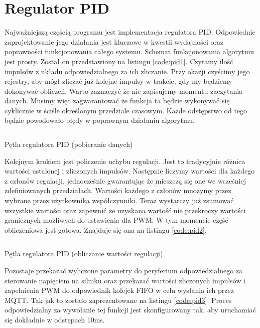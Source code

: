     \section{Regulator PID}     %
     Najważniejszą częścią programu jest implementacja regulatora PID. Odpowiednie zaprojektowanie jego działania jest kluczowe w kwestii wydajności oraz poprawności funkcjonowania całego systemu. Schemat funkcjonowania algorytmu jest prosty. Został on przedstawiony na listingu \ref{code:pid1}. Czytamy ilość impulsów z układu odpowiedzialnego za ich zliczanie. Przy okazji czyścimy jego rejestry, aby mógł zliczać już kolejne impulsy w trakcie, gdy my będziemy dokonywać obliczeń. Warto zaznaczyć że nie zapisujemy momentu zaczytania danych. Musimy więc zagwarantować że funkcja ta będzie wykonywać się cyklicznie w ściśle określonym przedziale czasowym. Każde odstępstwo od tego będzie powodowało błędy w poprawnym działaniu algorytmu. 
     
    \begin{kod}
      \inputminted[firstline=1,lastline=8]{cpp}{esp/listings/pid.cpp}
      \caption{Pętla regulatora PID (pobieranie danych)}
      \label{code:pid1}
      \vspace{2em}
    \end{kod}

     Kolejnym krokiem jest policzenie uchybu regulacji. Jest to tradycyjnie różnica wartości ustalonej i zliczonych impulsów. Następnie liczymy wartości dla każdego z członów regulacji, jednocześnie gwarantując że mieszczą się one we wcześniej zdefiniowanych przedziałach. Wartości każdego z członów mnożymy przez wybrane przez użytkownika współczynniki. Teraz wystarczy już zsumować wszystkie wartości oraz zapewnić że uzyskana wartość nie przekroczy wartości granicznych możliwych do ustawienia dla PWM. W tym momencie część obliczeniowa jest gotowa. Znajduje się ona na listingu \ref{code:pid2}. 
     
    \begin{kod}
      \inputminted[firstline=10,lastline=25]{cpp}{esp/listings/pid.cpp}
      \caption{Pętla regulatora PID (obliczanie wartości regulacji)}
      \label{code:pid2}
      \vspace{2em}
    \end{kod}
    
     Pozostaje przekazać wyliczone parametry do peryferium odpowiedzialnego za sterowanie napięciem na silniku oraz przekazać wartości zliczonych impulsów i zapełnienia PWM do odpowiednik kolejek FIFO w celu wysłania ich przez MQTT. Tak jak to zostało zaprezentowane na listingu \ref{code:pid3}. Proces odpowiedzialny za wywołanie tej funkcji jest skonfigurowany tak, aby uruchamiać się dokładnie w odstępach 10ms. 
     
